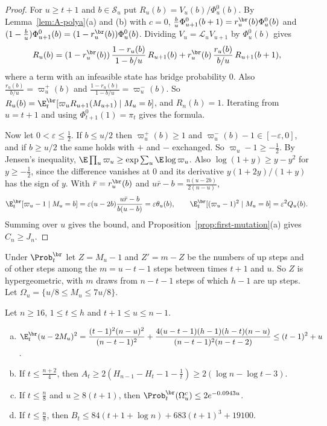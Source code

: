 \begin{proof}
For $u\ge t+1$ and $b\in\mathcal S_u$ put $R_u(b)=V_u(b)/\Phi^0_u(b)$. By
Lemma~\ref{lem:A-polya}(a) and (b) with $c=0$,
$\frac bu\Phi^0_{u+1}(b+1)=r^{\br}_u(b)\Phi^0_u(b)$ and
$(1-\frac bu)\Phi^0_{u+1}(b)=(1-r^{\br}_u(b))\Phi^0_u(b)$. Dividing
$V_u=\mathcal L_uV_{u+1}$ by $\Phi^0_u(b)$ gives
\[
 R_u(b)=(1-r^{\br}_u(b))\,\frac{1-r_u(b)}{1-b/u}\,R_{u+1}(b)
 +r^{\br}_u(b)\,\frac{r_u(b)}{b/u}\,R_{u+1}(b+1),
\]
where a term with an infeasible state has bridge probability 0. Also
$\frac{r_u(b)}{b/u}=\varpi^+_u(b)$ and
$\frac{1-r_u(b)}{1-b/u}=\varpi^-_u(b)$. So
$R_u(b)=\E^{\br}_t[\varpi_uR_{u+1}(M_{u+1})\mid M_u=b]$, and $R_n(h)=1$.
Iterating from $u=t+1$ and using $\Phi^0_{t+1}(1)=\pi_t$ gives the formula.

Now let $0<\varepsilon\le\frac12$. If $b\le u/2$ then $\varpi^+_u(b)\ge1$
and $\varpi^-_u(b)-1\in[-\varepsilon,0]$, and if $b\ge u/2$ the same holds
with $+$ and $-$ exchanged. So $\varpi_u-1\ge-\frac12$. By Jensen's
inequality, $\E\prod_u\varpi_u\ge\exp\sum_u\E\log\varpi_u$. Also
$\log(1+y)\ge y-y^2$ for $y\ge-\frac12$, since the difference vanishes at 0
and its derivative $y(1+2y)/(1+y)$ has the sign of $y$. With
$\bar r=r^{\br}_u(b)$ and $u\bar r-b=\frac{n(u-2b)}{2(n-u)}$,
\[
 \E^{\br}_t[\varpi_u-1\mid M_u=b]=\varepsilon(u-2b)\frac{u\bar r-b}{b(u-b)}
 =\varepsilon\theta_u(b),\qquad
 \E^{\br}_t[(\varpi_u-1)^2\mid M_u=b]=\varepsilon^2Q_u(b).
\]
Summing over $u$ gives the bound, and
Proposition~\ref{prop:first-mutation}(a) gives $C_n\ge J_n$.
\end{proof}

Under $\Prob^{\br}_t$ let $Z=M_u-1$ and $Z'=m-Z$ be the numbers of up steps
and of other steps among the $m=u-t-1$ steps between times $t+1$ and $u$. So
$Z$ is hypergeometric, with $m$ draws from $n-t-1$ steps of which $h-1$ are
up steps. Let $\Omega_u=\{u/8\le M_u\le7u/8\}$.

\begin{lemma}\label{lem:A-AB}
Let $n\ge16$, $1\le t\le h$ and $t+1\le u\le n-1$.
\begin{enumerate}[(a)]
\item $\displaystyle\E^{\br}_t(u-2M_u)^2=\frac{(t-1)^2(n-u)^2}{(n-t-1)^2}
+\frac{4(u-t-1)(h-1)(h-t)(n-u)}{(n-t-1)^2(n-t-2)}\le(t-1)^2+u$.
\item If $t\le\frac{n+2}4$, then
$A_t\ge2(H_{n-1}-H_t-1-\frac1t)\ge2(\log n-\log t-3)$.
\item If $t\le\frac n8$ and $u\ge8(t+1)$, then
$\Prob^{\br}_t(\Omega_u^c)\le2e^{-0.0943u}$.
\item If $t\le\frac n8$, then $B_t\le84(t+1+\log n)+683(t+1)^3+19100$.
\end{enumerate}
\end{lemma}

